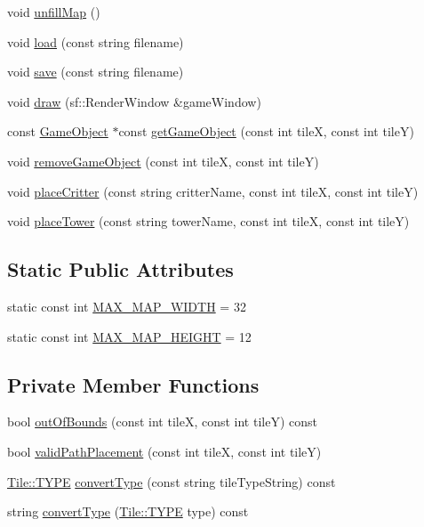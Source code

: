 \begin{DoxyCompactItemize}
\item 
void \hyperlink{class_map_a69d219d410a5c2c48bbf493c1af04dee}{unfill\+Map} ()
\item 
void \hyperlink{class_map_a2b6b1ca722620f097ea044f1c41e411e}{load} (const string filename)
\item 
void \hyperlink{class_map_a7c8e0a56747581e1b9f5248ceb043275}{save} (const string filename)
\item 
void \hyperlink{class_map_a84c0e37119c02d7c81071271e004041d}{draw} (sf\+::\+Render\+Window \&game\+Window)
\item 
const \hyperlink{class_game_object}{Game\+Object} $\ast$const \hyperlink{class_map_ac6851c4a19daaafd76eb5bcd9be23f1b}{get\+Game\+Object} (const int tile\+X, const int tile\+Y)
\item 
void \hyperlink{class_map_ab12fa393f25fbbd4ad2fa183a033162b}{remove\+Game\+Object} (const int tile\+X, const int tile\+Y)
\item 
void \hyperlink{class_map_afba6396c482b9af9671bc33d7ffdb8dd}{place\+Critter} (const string critter\+Name, const int tile\+X, const int tile\+Y)
\item 
void \hyperlink{class_map_a7f1f7f192ff9f48806d5d192fb38d3aa}{place\+Tower} (const string tower\+Name, const int tile\+X, const int tile\+Y)
\end{DoxyCompactItemize}
\subsection*{Static Public Attributes}
\begin{DoxyCompactItemize}
\item 
static const int \hyperlink{class_map_ae9582bc1e99bdf1ecc5413f81cc95f69}{M\+A\+X\+\_\+\+M\+A\+P\+\_\+\+W\+I\+D\+T\+H} = 32
\item 
static const int \hyperlink{class_map_aef313313ef5bbeafeae1f6b66073bace}{M\+A\+X\+\_\+\+M\+A\+P\+\_\+\+H\+E\+I\+G\+H\+T} = 12
\end{DoxyCompactItemize}
\subsection*{Private Member Functions}
\begin{DoxyCompactItemize}
\item 
bool \hyperlink{class_map_a6995c0de6fe380ffa652990490b867c8}{out\+Of\+Bounds} (const int tile\+X, const int tile\+Y) const 
\item 
bool \hyperlink{class_map_a63a6d8a5e6bcbc1cc92cd29fcff638db}{valid\+Path\+Placement} (const int tile\+X, const int tile\+Y)
\item 
\hyperlink{class_tile_acb53d82f9dacff45a98acc63276928eb}{Tile\+::\+T\+Y\+P\+E} \hyperlink{class_map_aae1f3e3de0581ba792b58290c164920f}{convert\+Type} (const string tile\+Type\+String) const 
\item 
string \hyperlink{class_map_a21333928f184469ef09d42112cd8f0a1}{convert\+Type} (\hyperlink{class_tile_acb53d82f9dacff45a98acc63276928eb}{Tile\+::\+T\+Y\+P\+E} type) const 
\end{DoxyCompactItemize}
